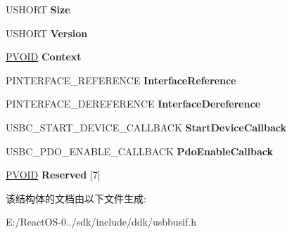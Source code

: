 \begin{DoxyCompactItemize}
\item 
\mbox{\label{struct___u_s_b_c___d_e_v_i_c_e___c_o_n_f_i_g_u_r_a_t_i_o_n___i_n_t_e_r_f_a_c_e___v1_a379bcada23234582e3cf9638382dbdf5}} 
U\+S\+H\+O\+RT {\bfseries Size}
\item 
\mbox{\label{struct___u_s_b_c___d_e_v_i_c_e___c_o_n_f_i_g_u_r_a_t_i_o_n___i_n_t_e_r_f_a_c_e___v1_aa4df8e0ae0ea4afbb82a0338eb73e862}} 
U\+S\+H\+O\+RT {\bfseries Version}
\item 
\mbox{\label{struct___u_s_b_c___d_e_v_i_c_e___c_o_n_f_i_g_u_r_a_t_i_o_n___i_n_t_e_r_f_a_c_e___v1_aaa168a37de79bf19d1f4e0effe6a9d15}} 
\hyperlink{interfacevoid}{P\+V\+O\+ID} {\bfseries Context}
\item 
\mbox{\label{struct___u_s_b_c___d_e_v_i_c_e___c_o_n_f_i_g_u_r_a_t_i_o_n___i_n_t_e_r_f_a_c_e___v1_a008fc63595cad68ca24fd89174786615}} 
P\+I\+N\+T\+E\+R\+F\+A\+C\+E\+\_\+\+R\+E\+F\+E\+R\+E\+N\+CE {\bfseries Interface\+Reference}
\item 
\mbox{\label{struct___u_s_b_c___d_e_v_i_c_e___c_o_n_f_i_g_u_r_a_t_i_o_n___i_n_t_e_r_f_a_c_e___v1_ad310d52e1e3a2a2e9cbfa2c221eca257}} 
P\+I\+N\+T\+E\+R\+F\+A\+C\+E\+\_\+\+D\+E\+R\+E\+F\+E\+R\+E\+N\+CE {\bfseries Interface\+Dereference}
\item 
\mbox{\label{struct___u_s_b_c___d_e_v_i_c_e___c_o_n_f_i_g_u_r_a_t_i_o_n___i_n_t_e_r_f_a_c_e___v1_a9ea102459950660bff3586e355e2b4c6}} 
U\+S\+B\+C\+\_\+\+S\+T\+A\+R\+T\+\_\+\+D\+E\+V\+I\+C\+E\+\_\+\+C\+A\+L\+L\+B\+A\+CK {\bfseries Start\+Device\+Callback}
\item 
\mbox{\label{struct___u_s_b_c___d_e_v_i_c_e___c_o_n_f_i_g_u_r_a_t_i_o_n___i_n_t_e_r_f_a_c_e___v1_a50f6dbc115721494295f7a2dd6b2e9c3}} 
U\+S\+B\+C\+\_\+\+P\+D\+O\+\_\+\+E\+N\+A\+B\+L\+E\+\_\+\+C\+A\+L\+L\+B\+A\+CK {\bfseries Pdo\+Enable\+Callback}
\item 
\mbox{\label{struct___u_s_b_c___d_e_v_i_c_e___c_o_n_f_i_g_u_r_a_t_i_o_n___i_n_t_e_r_f_a_c_e___v1_aed7ca17aa6d1554689895f8edbb07db6}} 
\hyperlink{interfacevoid}{P\+V\+O\+ID} {\bfseries Reserved} \mbox{[}7\mbox{]}
\end{DoxyCompactItemize}


该结构体的文档由以下文件生成\+:\begin{DoxyCompactItemize}
\item 
E\+:/\+React\+O\+S-\/0../sdk/include/ddk/usbbusif.\+h\end{DoxyCompactItemize}
